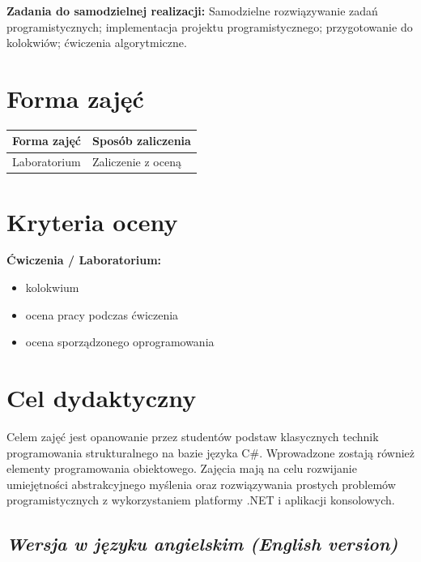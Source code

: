 \documentclass[12pt, a4paper]{article}
\newcommand{\thdrule}{\noalign{\global\setlength{\extrarowheight}{0pt}}}
\newcommand{\thdend}{\noalign{\global\setlength{\extrarowheight}{3pt}}}
\begin{document}
\vspace{4pt}
\noindent\textbf{Zadania do samodzielnej realizacji:} Samodzielne rozwiązywanie zadań programistycznych; implementacja projektu programistycznego; przygotowanie do kolokwiów; ćwiczenia algorytmiczne.

\section{Forma zajęć}

\begin{center}
{\scriptsize
\begin{tabular}{m{5cm}m{8cm}}
\thdrule\toprule
\rowcolor{pjatkRed} {\color{white}\textbf{Forma zajęć}} & {\color{white}\textbf{Sposób zaliczenia}} \\
\midrule\thdend
  \rowcolor{tableRowLight} Laboratorium & Zaliczenie z oceną \\
\bottomrule
\end{tabular}}
\end{center}

\section{Kryteria oceny}

\textbf{Ćwiczenia / Laboratorium:}
\begin{itemize}
  \item kolokwium
  \item ocena pracy podczas ćwiczenia
  \item ocena sporządzonego oprogramowania
\end{itemize}


\section{Cel dydaktyczny}

Celem zajęć jest opanowanie przez studentów podstaw klasycznych technik programowania strukturalnego na bazie języka C\#. Wprowadzone zostają również elementy programowania obiektowego. Zajęcia mają na celu rozwijanie umiejętności abstrakcyjnego myślenia oraz rozwiązywania prostych problemów programistycznych z wykorzystaniem platformy .NET i aplikacji konsolowych.

\subsection*{\textit{Wersja w języku angielskim (English version)}}
\end{document}
